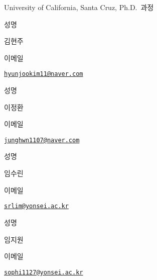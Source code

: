 \documentclass[
]{book}
\begin{document}
University of California, Santa Cruz, Ph.D.~과정

성명

김현주

이메일

\href{mailto:hyunjookim11@naver.com}{\nolinkurl{hyunjookim11@naver.com}}

성명

이정환

이메일

\href{mailto:junghwn1107@naver.com}{\nolinkurl{junghwn1107@naver.com}}

성명

임수린

이메일

\href{mailto:srlim@yonsei.ac.kr}{\nolinkurl{srlim@yonsei.ac.kr}}

성명

임지원

이메일

\href{mailto:sophi1127@yonsei.ac.kr}{\nolinkurl{sophi1127@yonsei.ac.kr}}

  
\end{document}

